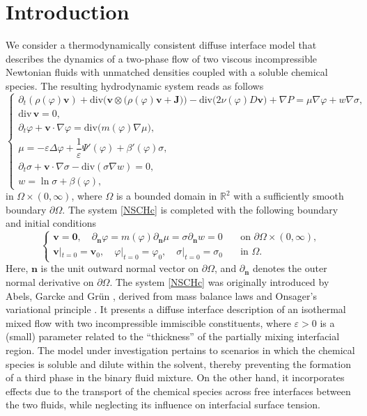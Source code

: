 \documentclass[11pt,reqno]{amsart}
\def\n{{\bm{n}}}
\def\div{\mathrm{div}}
\def\J{\mathbf{J}}
\def\vv{\bm{v}}
\begin{document}
\section{Introduction}
\setcounter{equation}{0}
We consider a thermodynamically consistent diffuse interface model that describes the dynamics of a two-phase flow of two viscous incompressible Newtonian fluids with unmatched densities coupled with a soluble chemical species. The resulting hydrodynamic system reads as follows
%
\begin{equation}
 \label{NSCHc}
\begin{cases}
\partial_t ( \rho(\varphi)\vv) + \div \big( \vv \otimes \big( \rho(\varphi) \vv + \J ) \big) - \div \big( 2\nu(\varphi) D \vv \big) + \nabla P
= \mu \nabla \varphi + w \nabla \sigma,\\
\div \, \vv=0,\\
\partial_t \varphi +\vv\cdot \nabla \varphi = \div\big(m(\varphi)\nabla \mu\big),\\
\mu= -\varepsilon \Delta \varphi+ \dfrac{1}{\varepsilon} \Psi'(\varphi) + \beta'(\varphi) \sigma,\\
\partial_t \sigma + \vv \cdot \nabla \sigma -\div \left( \sigma \nabla w\right)=0,\\
w = \ln \sigma + \beta(\varphi),
\end{cases}
\end{equation}
%
in $\Omega \times (0,\infty)$, where $\Omega$ is a bounded domain in $\mathbb{R}^2$ with a sufficiently smooth boundary $\partial \Omega$. The system \eqref{NSCHc} is completed with the following boundary and initial conditions
%
\begin{equation}
\label{NSCHc-bic}
\begin{cases}
\vv=\mathbf{0}, \quad \partial_\n \varphi
= m(\varphi)\partial_\n \mu
= \sigma \partial_\n w=0 \quad &\text{on }  \partial \Omega \times (0,\infty),\\
\vv|_{t=0}=\vv_0, \quad \varphi|_{t=0}=\varphi_0, \quad \sigma|_{t=0}=\sigma_0 \quad &\text{in } \Omega.
\end{cases}
\end{equation}
%
Here, $\n$ is the unit outward normal vector on $\partial \Omega$, and $\partial_\n$ denotes the outer normal derivative on $\partial \Omega$.
%
The system \eqref{NSCHc} was originally introduced by Abels, Garcke and Gr\"{u}n \cite{AGG2012}, derived from mass balance laws and Onsager's variational principle \cite{Ons31}. It presents a diffuse interface description of an isothermal mixed flow with two incompressible immiscible constituents, where $\varepsilon>0$ is a (small) parameter related to the ``thickness'' of the partially mixing interfacial region. The model under investigation pertains to scenarios in which the chemical species is soluble and dilute within the solvent, thereby preventing the formation of a third phase in the binary fluid mixture. On the other hand, it incorporates effects due to the transport of the chemical species across free interfaces between the two fluids,
while neglecting its influence on interfacial surface tension.
\end{document}
